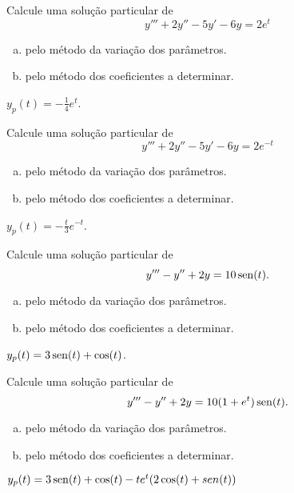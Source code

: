 \begin{exer}
  Calcule uma solução particular de
  \begin{equation}
    y''' + 2y'' - 5y' - 6y = 2e^t
  \end{equation}
  \begin{enumerate}[a)]
  \item pelo método da variação dos parâmetros.
  \item pelo método dos coeficientes a determinar.
  \end{enumerate}
\end{exer}
\begin{resp}
  $y_p(t) = -\frac{1}{4}e^{t}$.
\end{resp}

\begin{exer}
  Calcule uma solução particular de
  \begin{equation}
    y''' + 2y'' - 5y' - 6y = 2e^{-t}
  \end{equation}
  \begin{enumerate}[a)]
  \item pelo método da variação dos parâmetros.
  \item pelo método dos coeficientes a determinar.
  \end{enumerate}
\end{exer}
\begin{resp}
  $y_p(t) = -\frac{t}{3}e^{-t}$.
\end{resp}

\begin{exer}
  Calcule uma solução particular de
  \begin{equation}
    y''' - y'' + 2y = 10\operatorname{sen}(t).
  \end{equation}
  \begin{enumerate}[a)]
  \item pelo método da variação dos parâmetros.
  \item pelo método dos coeficientes a determinar.
  \end{enumerate}
\end{exer}
\begin{resp}
  $y_p(t) = 3\operatorname{sen}(t) + \cos(t)$.
\end{resp}

\begin{exer}
  Calcule uma solução particular de
  \begin{equation}
    y''' - y'' + 2y = 10(1 + e^t)\operatorname{sen}(t).
  \end{equation}
  \begin{enumerate}[a)]
  \item pelo método da variação dos parâmetros.
  \item pelo método dos coeficientes a determinar.
  \end{enumerate}
\end{exer}
\begin{resp}
  $y_p(t) = 3\operatorname{sen}(t) + \cos(t) - te^{t}(2\cos(t) + sen(t))$
\end{resp}
